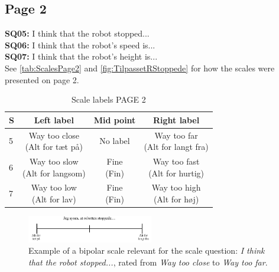 \subsection{Page 2}
\noindent
\textbf{SQ05:} I think that the robot stopped... \\%
\textbf{SQ06:} I think that the robot's speed is... \\%
\textbf{SQ07:} I think that the robot's height is... \\%
See \autoref{tab:ScalesPage2} and \autoref{fig:TilpassetRStoppede} for how the scales were presented on page 2.
\begin{table}[H]
	\centering
\caption{Scale labels PAGE 2}
	\label{tab:ScalesPage2} 
	\begin{tabular}{l|c|c|c}
		S     & Left label & Mid point & Right label \\\hline
		5   & \makecell{Way too close\\(Alt for tæt på)}  & No label & \makecell{Way too far \\(Alt for langt fra)}        \\\hline
		6   & \makecell{Way too slow\\(Alt for langsom)} & \makecell{Fine\\(Fin)} & \makecell{Way too fast \\(Alt for hurtig)}         \\\hline
		7   & \makecell{Way too low \\(Alt for lav)} & \makecell{Fine\\(Fin)} & \makecell{Way too high\\(Alt for høj)}                
	\end{tabular}        
\end{table}
\noindent
%
\begin{figure}[H]
\centering
\includegraphics[width = 0.49\textwidth]{Figure/TilpassetRStoppede}
\setlength{} 
\caption{Example of a bipolar scale relevant for the scale question: \textit{I think that the robot stopped...}, rated from \textit{Way too close} to \textit{Way too far}.}
\label{fig:TilpassetRStoppede}
\end{figure}
\noindent
% 
